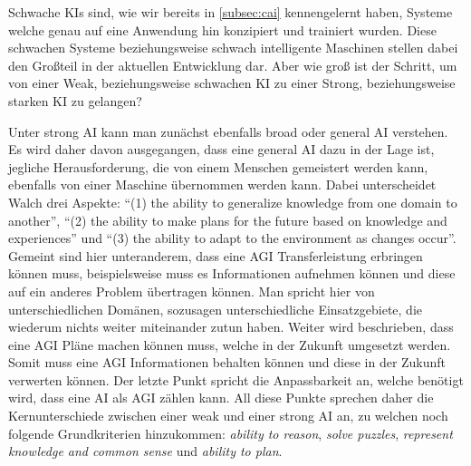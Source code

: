             Schwache KIs sind, wie wir bereits in \ref{subsec:cai} kennengelernt haben, Systeme welche genau auf
            eine Anwendung hin konzipiert und trainiert wurden. Diese schwachen Systeme beziehungsweise schwach
            intelligente Maschinen stellen dabei den Großteil in der aktuellen Entwicklung dar. \cite{brendel_2019}
            Aber wie groß ist der Schritt, um von einer Weak, beziehungsweise schwachen KI zu einer Strong,
            beziehungsweise starken KI zu gelangen?

            Unter strong AI kann man zunächst ebenfalls broad oder general AI verstehen.\cite{walch_world_2019}
            Es wird daher davon ausgegangen, dass eine general AI dazu in der Lage ist, jegliche Herausforderung,
            die von einem Menschen gemeistert werden kann, ebenfalls von einer Maschine übernommen werden kann.
            Dabei unterscheidet Walch drei Aspekte: ``(1) the ability to generalize knowledge from one domain to
            another'', ``(2) the ability to make plans for the future based on knowledge and experiences'' und
            ``(3) the ability to adapt to the environment as changes occur''. Gemeint sind hier unteranderem,
            dass eine AGI Transferleistung erbringen können muss, beispielsweise muss es Informationen aufnehmen
            können und diese auf ein anderes Problem übertragen können. Man spricht hier von unterschiedlichen
            Domänen, sozusagen unterschiedliche Einsatzgebiete, die wiederum nichts weiter miteinander zutun
            haben. \cite{walch_world_2019} Weiter wird beschrieben, dass eine AGI Pläne machen können muss,
            welche in der Zukunft umgesetzt werden. Somit muss eine AGI Informationen behalten können und diese
            in der Zukunft verwerten können. Der letzte Punkt spricht die Anpassbarkeit an, welche benötigt
            wird, dass eine AI als AGI zählen kann. All diese Punkte sprechen daher die Kernunterschiede zwischen
            einer weak und einer strong AI an, zu welchen noch folgende Grundkriterien hinzukommen:
            \textit{ability to reason}, \textit{solve puzzles}, \textit{represent knowledge and common sense} und
            \textit{ability to plan}.

